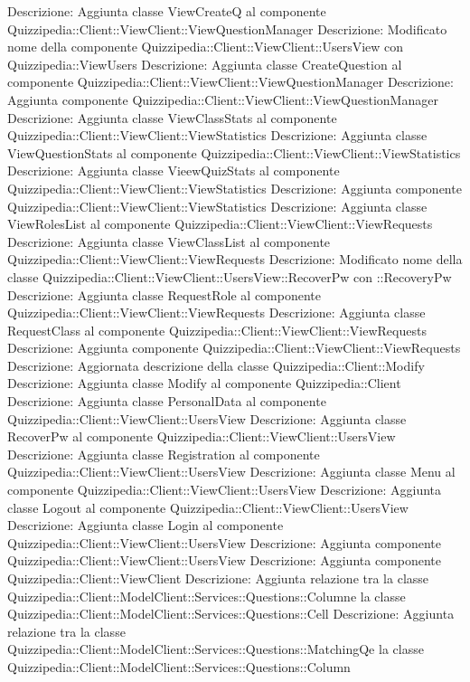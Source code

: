 Descrizione: Aggiunta classe ViewCreateQ al componente Quizzipedia::Client::ViewClient::ViewQuestionManager 
Descrizione: Modificato nome della componente Quizzipedia::Client::ViewClient::UsersView con Quizzipedia::ViewUsers 
Descrizione: Aggiunta classe CreateQuestion al componente Quizzipedia::Client::ViewClient::ViewQuestionManager 
Descrizione: Aggiunta componente Quizzipedia::Client::ViewClient::ViewQuestionManager 
Descrizione: Aggiunta classe ViewClassStats al componente Quizzipedia::Client::ViewClient::ViewStatistics 
Descrizione: Aggiunta classe ViewQuestionStats al componente Quizzipedia::Client::ViewClient::ViewStatistics 
Descrizione: Aggiunta classe VieewQuizStats al componente Quizzipedia::Client::ViewClient::ViewStatistics 
Descrizione: Aggiunta componente Quizzipedia::Client::ViewClient::ViewStatistics 
Descrizione: Aggiunta classe ViewRolesList al componente Quizzipedia::Client::ViewClient::ViewRequests 
Descrizione: Aggiunta classe ViewClassList al componente Quizzipedia::Client::ViewClient::ViewRequests 
Descrizione: Modificato nome della classe Quizzipedia::Client::ViewClient::UsersView::RecoverPw con ::RecoveryPw 
Descrizione: Aggiunta classe RequestRole al componente Quizzipedia::Client::ViewClient::ViewRequests 
Descrizione: Aggiunta classe RequestClass al componente Quizzipedia::Client::ViewClient::ViewRequests 
Descrizione: Aggiunta componente Quizzipedia::Client::ViewClient::ViewRequests 
Descrizione: Aggiornata descrizione della classe Quizzipedia::Client::Modify 
Descrizione: Aggiunta classe Modify al componente Quizzipedia::Client 
Descrizione: Aggiunta classe PersonalData al componente Quizzipedia::Client::ViewClient::UsersView 
Descrizione: Aggiunta classe RecoverPw al componente Quizzipedia::Client::ViewClient::UsersView 
Descrizione: Aggiunta classe Registration al componente Quizzipedia::Client::ViewClient::UsersView 
Descrizione: Aggiunta classe Menu al componente Quizzipedia::Client::ViewClient::UsersView 
Descrizione: Aggiunta classe Logout al componente Quizzipedia::Client::ViewClient::UsersView 
Descrizione: Aggiunta classe Login al componente Quizzipedia::Client::ViewClient::UsersView 
Descrizione: Aggiunta componente Quizzipedia::Client::ViewClient::UsersView 
Descrizione: Aggiunta componente Quizzipedia::Client::ViewClient 
Descrizione: Aggiunta relazione tra la classe Quizzipedia::Client::ModelClient::Services::Questions::Columne la classe Quizzipedia::Client::ModelClient::Services::Questions::Cell 
Descrizione: Aggiunta relazione tra la classe Quizzipedia::Client::ModelClient::Services::Questions::MatchingQe la classe Quizzipedia::Client::ModelClient::Services::Questions::Column 
